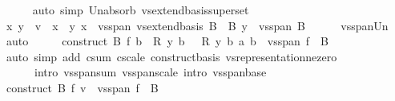 \begin{isabellebody}
\ \ \ \ \isamarkupfalse%
\ {\isacharparenleft}{\kern0pt}auto\ simp{\isacharcolon}{\kern0pt}\ Un{\isacharunderscore}{\kern0pt}absorb{}\ vs{}{\isachardot}{\kern0pt}extend{\isacharunderscore}{\kern0pt}basis{\isacharunderscore}{\kern0pt}superset{\isacharparenright}{\kern0pt}\isanewline
\ \ \isamarkupfalse%
\ \isamarkupfalse%
\ x\ y\ \ {\isachardoublequoteopen}v\ {\isacharequal}{\kern0pt}\ x\ {\isacharplus}{\kern0pt}\ y{\isachardoublequoteclose}\ {\isachardoublequoteopen}x\ {\isasymin}\ vs{}{\isachardot}{\kern0pt}span\ {\isacharparenleft}{\kern0pt}vs{}{\isachardot}{\kern0pt}extend{\isacharunderscore}{\kern0pt}basis\ B\ {\isacharminus}{\kern0pt}\ B{\isacharparenright}{\kern0pt}{\isachardoublequoteclose}\ {\isachardoublequoteopen}y\ {\isasymin}\ vs{}{\isachardot}{\kern0pt}span\ B{\isachardoublequoteclose}\isanewline
\ \ \ \ \isamarkupfalse%
\ vs{}{\isachardot}{\kern0pt}span{\isacharunderscore}{\kern0pt}Un\ \isamarkupfalse%
\ auto\isanewline
\ \ \isamarkupfalse%
\ \isamarkupfalse%
\ {\isachardoublequoteopen}construct\ B\ f\ {\isacharparenleft}{\kern0pt}{\isasymSum}b\ {\isacharbar}{\kern0pt}\ {\isacharquery}{\kern0pt}R\ y\ b\ {\isasymnoteq}\ {}{\isachardot}{\kern0pt}\ {\isacharquery}{\kern0pt}R\ y\ b\ {\isacharasterisk}{\kern0pt}a\ b{\isacharparenright}{\kern0pt}\ {\isasymin}\ vs{}{\isachardot}{\kern0pt}span\ {\isacharparenleft}{\kern0pt}f\ {\isacharbackquote}{\kern0pt}\ B{\isacharparenright}{\kern0pt}{\isachardoublequoteclose}\isanewline
\ \ \ \ \isamarkupfalse%
\ {\isacharparenleft}{\kern0pt}auto\ simp\ add{\isacharcolon}{\kern0pt}\ c{\isachardot}{\kern0pt}sum\ c{\isachardot}{\kern0pt}scale\ construct{\isacharunderscore}{\kern0pt}basis\ vs{}{\isachardot}{\kern0pt}representation{\isacharunderscore}{\kern0pt}ne{\isacharunderscore}{\kern0pt}zero\isanewline
\ \ \ \ \ \ intro{\isacharbang}{\kern0pt}{\isacharcolon}{\kern0pt}\ vs{}{\isachardot}{\kern0pt}span{\isacharunderscore}{\kern0pt}sum\ vs{}{\isachardot}{\kern0pt}span{\isacharunderscore}{\kern0pt}scale\ intro{\isacharcolon}{\kern0pt}\ vs{}{\isachardot}{\kern0pt}span{\isacharunderscore}{\kern0pt}base\ {\isacharparenright}{\kern0pt}\isanewline
\ \ \isamarkupfalse%
\ \isamarkupfalse%
\ {\isachardoublequoteopen}construct\ B\ f\ v\ {\isasymin}\ vs{}{\isachardot}{\kern0pt}span\ {\isacharparenleft}{\kern0pt}f\ {\isacharbackquote}{\kern0pt}\ B{\isacharparenright}{\kern0pt}{\isachardoublequoteclose}\isanewline

\end{isabellebody}

